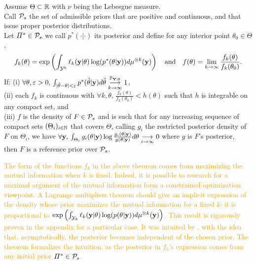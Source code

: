 \begin{thm}\label{thm:intro-ref:explicitRP}
    Assume $\Theta\subset\RR$ with $\nu$ being the Lebesgue measure.\\
    Call $\cP_s$ the set of admissible priors that are positive and continuous, and that issue proper posterior distributions.\\
    Let $\varPi^\ast\in\cP_s$ we call $p^\ast(\cdot|\cdot)$ its posterior and define for any interior point $\theta_0\in\Theta$,
        \begin{equation}
                f_k(\theta) = \exp\left(\int_{\cY^k}\ell_k(\mbf y|\theta)\log(p^\ast(\theta|\mbf y)) d\mu^{\otimes k}(\mbf y) \right) \quad\text{and}\quad  %
                f(\theta) = \lim_{k\rightarrow\infty}\frac{f_k(\theta)}{f_k(\theta_0)}.
        \end{equation}
    If: (i) $ \forall \theta,\eps>0,\,\int_{|\tilde\theta-\theta|<\eps} p^\ast(\tilde\theta|\mbf y)d\tilde\theta \conv[\PP_{\mbf Y|\theta}]{k\rightarrow\infty}1$,\\ (ii) each $f_k$ is continuous with $\forall k,\theta,\, \frac{f_k(\theta)}{f_k(\theta_0)} <h(\theta)$ such that $h$ is integrable on any compact set, and\\
    (iii) $f$ is the density of $F\in\cP_s$  and is such that for any increasing sequence of compact sets $(\Theta_i)_{i\in\NN}$ that covers $\Theta$, calling $g_i$ the restricted posterior density of $F$ on $\Theta_i$, we have $\forall \mbf y,\, \int_{\Theta_i}g_i(\theta|\mbf y)\log\frac{g_i(\theta|\mbf y)}{g(\theta|\mbf y)}d\theta \conv{i\rightarrow\infty}0$ where $g$ is $F$'s posterior,\\
    then $F$ is a reference prior over $\cP_s$.
 \end{thm}

 \textcolor{orange}{
The form of the functions $f_k$ in the above theorem comes from maximizing the mutual information when $k$ is fixed. Indeed, it is possible to research for a maximal argument of the mutual information
form a constrained optimization viewpoint. A Lagrange multipliers theorem should give
an implicit expression of the density whose prior maximizes the mutual information for a fixed $k$: it is
proportional to 
    $\exp\left(\int_{\cY_k}\ell_k(\mbf y|\theta)\log(p(\theta|\mbf y) ) d\mu^{\otimes k}(\mbf y)\right)$. 
This result is rigorously proven in the appendix for a particular case. 
It was intuited by \citet{bernardo_bayesian_1994}, with the idea that, asymptotically, the posterior becomes independent of the chosen prior. The theorem formalizes the intuition, as the posterior in $f_k$'s expression comes from any initial prior $\varPi^\ast\in\cP_s$.
}
%


